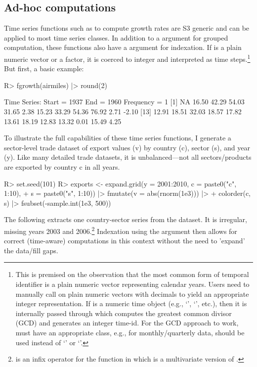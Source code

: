 \documentclass[nojss]{jss} %
\newcommand{\class}[1]{`\code{#1}'}
\newcommand{\fct}[1]{\code{#1()}}
\begin{document}
\subsection{Ad-hoc computations}
%
Time series functions such as \fct{fgrowth} to compute growth rates are S3 generic and can be applied to most time series classes. In addition to a  argument for grouped computation, these functions also have a  argument for indexation. If  is a plain numeric vector or a factor, it is coerced to integer and interpreted as time steps.\footnote{This is premised on the observation that the most common form of temporal identifier is a plain numeric vector representing calendar years. Users need to manually call  on plain numeric vectors with decimals to yield an appropriate integer representation. If  is a numeric time object (e.g., \class{Date}, \class{POSIXct}, etc.), then it is internally passed through  which computes the greatest common divisor (GCD) and generates an integer time-id. For the GCD approach to work,  must have an appropriate class, e.g., for monthly/quarterly data,  should be used instead of \class{Date} or \class{POSIXct}.} But first, a basic example:
%
\begin{Schunk}
\begin{Sinput}
R> fgrowth(airmiles) |> round(2)
\end{Sinput}
\begin{Soutput}
Time Series:
Start = 1937
End = 1960
Frequency = 1
 [1]    NA 16.50 42.29 54.03 31.65  2.38 15.23 33.29 54.36 76.92  2.71 -2.10
[13] 12.91 18.51 32.03 18.57 17.82 13.61 18.19 12.83 13.32  0.01 15.49  4.25
\end{Soutput}
\end{Schunk}
To illustrate the full capabilities of these time series functions, I generate a sector-level trade dataset of export values (v) by country (c), sector (s), and year (y). Like many detailed trade datasets, it is unbalanced---not all sectors/products are exported by country c in all years.
\begin{Schunk}
\begin{Sinput}
R> set.seed(101)
R> exports <- expand.grid(y = 2001:2010, c = paste0("c", 1:10),
+    s = paste0("s", 1:10)) |> fmutate(v = abs(rnorm(1e3))) |>
+    colorder(c, s) |> fsubset(-sample.int(1e3, 500))
\end{Sinput}
\end{Schunk}
The following extracts one country-sector series from the  dataset. It is irregular, missing years 2003 and 2006.\footnote{\code{\%=\%} is an infix operator for the \fct{massign} function in  which is a multivariate version of \fct{assign}.} Indexation using the  argument then allows for correct (time-aware) computations in this context without the need to 'expand' the data/fill gaps.
\end{document}
